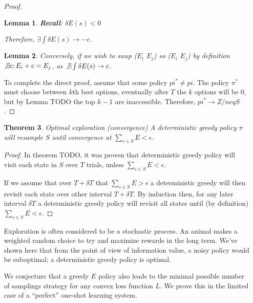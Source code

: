 \documentclass[9pt,twocolumn,twoside]{pnas-new}
\newtheorem{theorem}{Theorem}
\newtheorem{lemma}[theorem]{Lemma}
\begin{document}
{{\begin{proof}
\begin{lemma}
    \textbf{Recall}: $\delta E(s) < 0$ 

    Therefore, $\exists \int \delta E(s) \rightarrow -c$. 
    \end{lemma}

    \begin{lemma}
    Conversely, if we wish to swap ($E_i$ \leq $E_j$) so ($E_i$ \geq $E_j$) by definition $\not \exists c; E_i + c = E_j$, as $\not \exists \int \delta E(s) \rightarrow c$. 
    \end{lemma}

    To complete the direct proof, assume that some policy $pi^* \neq pi$. The policy $\pi^*$ must choose between $k$th best options, eventually after $T$ the $k$ options will be 0, but by Lemma TODO the top $k-1$ are inaccessible. Therefore, $pi^* \rightarrow Z /neq S$.
\end{proof}

\begin{theorem}{Optimal exploration (convergence)}
    A deterministic greedy policy $\pi$ will resample $S$ until convergence at $\sum_{s \in S} E < \epsilon$.
\end{theorem}
\begin{proof}
    In theorem TODO, it was proven that deterministic greedy policy will visit each state in $S$ over $T$ trials, unless $\sum_{s \in S} E < \epsilon$. 
    
    If we assume that over $T + \delta T$ that $\sum_{s \in S} E > \epsilon$ a deterministic greedy will then revisit each state over other interval $T + \delta T$. By induction then, for any later interval $\delta T$ a deterministic greedy policy will revisit all states until (by definition) $\sum_{s \in S} E < \epsilon$.
\end{proof}

Exploration is often considered to be a stochastic process. An animal makes a weighted random choice to try and maximize rewards in the long term. We've shown here that from the point of view of information value, a noisy policy would be suboptimal; a deterministic greedy policy is optimal.

We conjecture that a greedy $E$ policy also leads to the minimal possible number of samplings strategy for any convex loss function $L$. We prove this in the limited case of a ``perfect'' one-shot learning system.


}}
\end{document}
